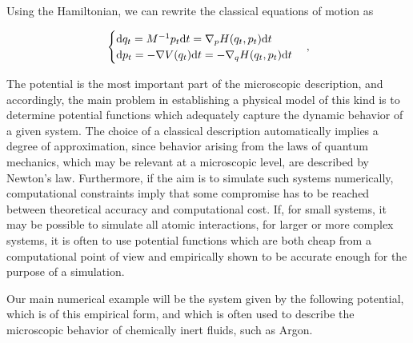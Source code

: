 Using the Hamiltonian, we can rewrite the classical equations of motion as

\begin{equation}
\label{eq:hamiltonian_dynamics}
\begin{cases}
    \mathrm{d} q_t=M^{-1}p_t\mathrm{d}t=\nabla_p H(q_t,p_t)\mathrm{d}t\\
    \mathrm{d} p_t=-\nabla V(q_t)\mathrm{d}t=-\nabla_q H(q_t,p_t)\mathrm{d}t
\end{cases},
\end{equation}

The potential is the most important part of the microscopic description, and accordingly, the main problem in establishing a physical model of this kind is to determine potential functions which adequately capture the dynamic behavior of a given system. 
The choice of a classical description automatically implies a degree of approximation, since behavior arising from the laws of quantum mechanics, which may be relevant at a microscopic level, are described by Newton's law.
 Furthermore, if the aim is to simulate such systems numerically, computational constraints imply that some compromise has to be reached between theoretical accuracy and computational cost. 
 If, for small systems, it may be possible to simulate all atomic interactions, for larger or more complex systems, it is often to use potential functions which are both cheap from a computational point of view and empirically shown to be accurate enough for the purpose of a simulation.
 
 Our main numerical example will be the system given by the following potential, which is of this empirical form, and which is often used to describe the microscopic behavior of chemically inert fluids, such as Argon.

